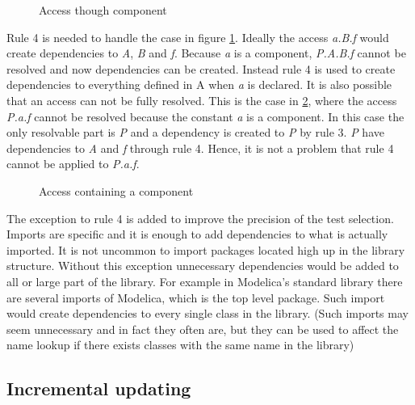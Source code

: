 \documentclass{cslthse-msc}
\begin{document}
\begin{figure}[!htbp]
    \centering
    \qquad
    \subfloat{\raisebox{4.7 cm}{}}
    \caption{Access though component}
    \label{fig:component}
\end{figure}

Rule 4 is needed to handle the case in figure \ref{fig:component}. Ideally the access \textit{a.B.f} would create dependencies to \textit{A}, \textit{B} and \textit{f}. Because \textit{a} is a component, \textit{P.A.B.f} cannot be resolved and now dependencies can be created. Instead rule 4 is used to create dependencies to everything defined in A when \textit{a} is declared.
It is also possible that an access can not be fully resolved. This is the case in \ref{fig:brokenAccess}, where the access \textit{P.a.f} cannot be resolved because the constant \textit{a} is a component. In this case the only resolvable part is \textit{P} and a  dependency is created to \textit{P} by rule 3. \textit{P} have dependencies to \textit{A} and \textit{f} through rule 4. Hence, it is not a problem that rule 4 cannot be applied to \textit{P.a.f}.

\begin{figure}[!htbp]
    \centering
    \qquad
    \subfloat{\raisebox{4.0 cm}{}}
    \caption{Access containing a component}
    \label{fig:brokenAccess}
\end{figure}

The exception to rule 4 is added to improve the precision of the test selection. Imports are specific and it is enough to add dependencies to what is actually imported. It is not uncommon to import packages located high up in the library structure. Without this exception unnecessary dependencies would be added to all or large part of the library. For example in Modelica's standard library there are several imports of Modelica, which is the top level package. Such import would create dependencies to every single class in the library. (Such imports may seem unnecessary and in fact they often are, but they can be used to affect the name lookup if there exists classes with the same name in the library)  



\subsection{Incremental updating}
\end{document}
